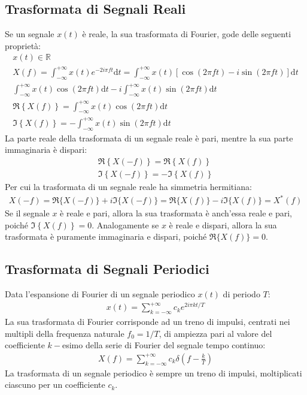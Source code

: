 \documentclass{article}
\newcommand{\df}{\mathrm{d}}
\numberwithin{equation}{subsection}
\begin{document}
\subsection{Trasformata di Segnali Reali}

Se un segnale $x(t)$ è reale, la sua trasformata di Fourier, gode delle seguenti proprietà:
\begin{gather*}
    x(t)\in\mathbb{R}\\
    X(f)=\displaystyle\int_{-\infty}^{+\infty}x(t)e^{-2i\pi ft}\df t=\int_{-\infty}^{+\infty}x(t)\left[\cos(2\pi ft)-i\sin(2\pi ft)\right]\df t\\
    \displaystyle\int_{-\infty}^{+\infty}x(t)\cos(2\pi ft)\df t-i\int_{-\infty}^{+\infty}x(t)\sin(2\pi ft)\df t\\
    \Re\left\{X(f)\right\}=\displaystyle\int_{-\infty}^{+\infty}x(t)\cos(2\pi ft)\df t\\
    \Im\left\{X(f)\right\}=\displaystyle-\int_{-\infty}^{+\infty}x(t)\sin(2\pi ft)\df t
\end{gather*}
La parte reale della trasformata di un segnale reale è pari, mentre la sua parte immaginaria è dispari:
\begin{gather}
    \Re\left\{X(-f)\right\}=\Re\left\{X(f)\right\}\\
    \Im\left\{X(-f)\right\}=-\Im\left\{X(f)\right\}
\end{gather}
Per cui la trasformata di un segnale reale ha simmetria hermitiana:
\begin{gather}
    X(-f)=\Re\{X(-f)\}+i\Im\{X(-f)\}=\Re\{X(f)\}-i\Im\{X(f)\}=X^*(f)
\end{gather}
Se il segnale $x$ è reale e pari, allora la sua trasformata è anch'essa reale e pari, poiché $\Im\left\{X(f)\right\}=0$. 
Analogamente se $x$ è reale e dispari, allora la sua trasformata è puramente immaginaria e dispari, poiché $\Re\{X(f)\}=0$. 

\subsection{Trasformata di Segnali Periodici}

Data l'espansione di Fourier di un segnale periodico $x(t)$ di periodo $T$:
\begin{gather*}
    x(t)=\displaystyle\sum_{k=-\infty}^{+\infty}c_ke^{2i\pi kt/T}
\end{gather*}
La sua trasformata di Fourier corrisponde ad un treno di impulsi, centrati nei multipli della frequenza naturale $f_0=1/T$, di ampiezza pari al valore del coefficiente $k-$esimo 
della serie di Fourier del segnale tempo continuo: 
\begin{gather*}
    X(f)=\displaystyle\sum_{k=-\infty}^{+\infty}c_k\delta\left(f-\frac{k}{T}\right)
\end{gather*}
La trasformata di un segnale periodico è sempre un treno di impulsi, moltiplicati ciascuno per un coefficiente $c_k$.
\end{document}
